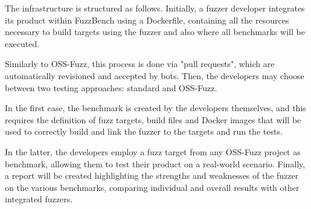 The infrastructure is structured as follows.
Initially, a fuzzer developer integrates its product within FuzzBench using a Dockerfile, containing all the resources necessary to build targets using the fuzzer and also where all benchmarks will be executed.

Similarly to OSS-Fuzz, this process is done via "pull requests", which are automatically revisioned and accepted by bots.
Then, the developers may choose between two testing approaches: standard and OSS-Fuzz.

In the first case, the benchmark is created by the developers themselves, and this requires the definition of fuzz targets, build files and Docker images that will be used to correctly build and link the fuzzer to the targets and run the tests.

In the latter, the developers employ a fuzz target from any OSS-Fuzz project as benchmark, allowing them to test their product on a real-world scenario.
Finally, a report will be created highlighting the strengths and weaknesses of the fuzzer on the various benchmarks, comparing individual and overall results with other integrated fuzzers.